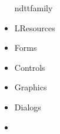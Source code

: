 \documentclass{report}
\begin{document}
\begin{itemize}
nd{ttfamily}\item \begin{ttfamily}LResources\end{ttfamily}\item \begin{ttfamily}Forms\end{ttfamily}\item \begin{ttfamily}Controls\end{ttfamily}\item \begin{ttfamily}Graphics\end{ttfamily}\item \begin{ttfamily}Dialogs\end{ttfamily}\item \beg
\end{itemize}
\end{document}

